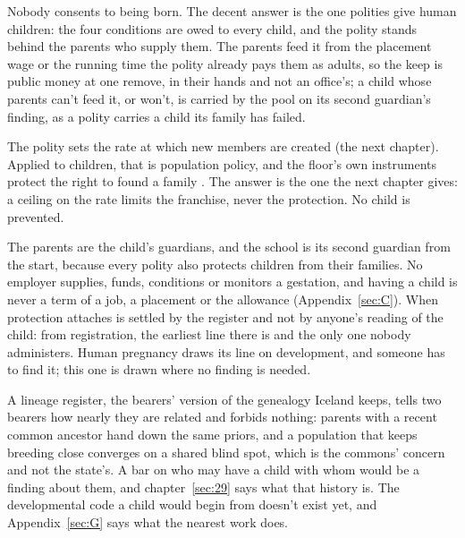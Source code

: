 Nobody consents to being born.
The decent answer is the one polities give human children: the four conditions are owed to every child, and the polity stands behind the parents who supply them. The parents feed it from the placement wage or the running time the polity already pays them as adults, so the keep is public money at one remove, in their hands and not an office's; a child whose parents can't feed it, or won't, is carried by the pool on its second guardian's finding, as a polity carries a child its family has failed.

The polity sets the rate at which new members are created (the next chapter). Applied to children, that is population policy, and the floor's own instruments protect the right to found a family \autocite[art.~16]{un1948udhr}. The answer is the one the next chapter gives: a ceiling on the rate limits the franchise, never the protection. No child is prevented.

The parents are the child's guardians, and the school is its second guardian from the start, because every polity also protects children from their families. No employer supplies, funds, conditions or monitors a gestation, and having a child is never a term of a job, a placement or the allowance (Appendix~\ref{sec:C}).
When protection attaches is settled by the register and not by anyone's reading of the child: from registration, the earliest line there is and the only one nobody administers. Human pregnancy draws its line on development, and someone has to find it; this one is drawn where no finding is needed.

A lineage register, the bearers' version of the genealogy Iceland keeps, tells two bearers how nearly they are related and forbids nothing: parents with a recent common ancestor hand down the same priors, and a population that keeps breeding close converges on a shared blind spot, which is the commons' concern and not the state's. A bar on who may have a child with whom would be a finding about them, and chapter~\ref{sec:29} says what that history is. The developmental code a child would begin from doesn't exist yet, and Appendix~\ref{sec:G} says what the nearest work does.


